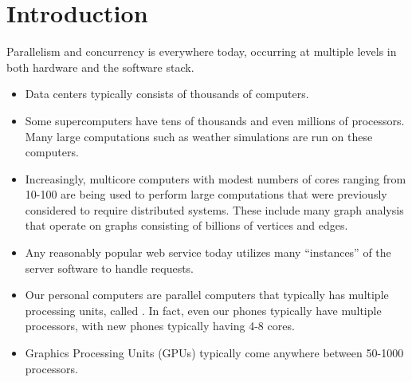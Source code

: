 \chapter{Introduction}

Parallelism and concurrency is everywhere today, occurring at multiple levels in both hardware and the software stack.  
%
\begin{itemize}
\item Data centers typically consists of thousands of computers.

\item Some supercomputers have tens of thousands and even millions of processors.  Many large computations such as weather simulations are run on these computers.

\item  Increasingly, multicore computers with modest numbers of cores ranging from 10-100 are being used to perform large computations that were previously considered to require distributed systems.  These include many graph analysis that operate on graphs consisting of billions of vertices and edges. 

\item  Any reasonably popular web service today utilizes many ``instances'' of the server software to handle requests.

\item  Our personal computers are parallel computers that typically has multiple processing units, called .
%
In fact, even our phones typically have multiple processors, with new phones typically having 4-8 cores.

\item Graphics Processing Units (GPUs) typically come anywhere between 50-1000 processors.
\end{itemize} 


